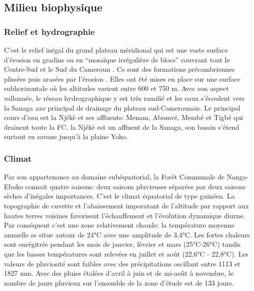 \documentclass[
  12pt,
  a4paper,
  extrafontsizes,
  onecolumn,
  openright]{book}
\theoremstyle{definition}
\theoremstyle{definition}
\theoremstyle{definition}
\theoremstyle{definition}
\theoremstyle{remark}
\begin{document}
\hypertarget{milieu-biophysique}{%
\subsection{Milieu biophysique}\label{milieu-biophysique}}

\hypertarget{relief-et-hydrographie}{%
\subsubsection{Relief et hydrographie}\label{relief-et-hydrographie}}

C'est le relief inégal du grand plateau méridional qui est une vaste surface d'érosion en gradins ou en \enquote{mosaïque irrégulière de blocs} couvrant tout le Centre-Sud et le Sud du Cameroun \citep{Martin1966}. Ce sont des formations précambriennes plissées puis arasées par l'érosion \citep{Servant2000}. Elles ont été mises en place sur une surface subhorizontale où les altitudes varient entre 600 et 750 m. Avec son aspect vallonnée, le réseau hydrographique y est très ramifié et les eaux s'écoulent vers la Sanaga axe principal de drainage du plateau sud-Camerounais. Le principal cours d'eau est la Njékè et ses affluents: Menam, Abomvé, Membé et Tigbé qui drainent toute la FC. la Njékè est un affluent de la Sanaga, son bassin s'étend surtout en savane jusqu'à la plaine Yoko.

\hypertarget{climat}{%
\subsubsection{Climat}\label{climat}}

Par son appartenance au domaine subéquatorial, la Forêt Communale de Nanga-Eboko connait quatre saisons: deux saisons pluvieuses séparées par deux saisons sèches d'inégales importances. C'est le climat équatorial de type guinéen. La topographie de cuvette et l'abaissement imporatant de l'altitude par rapport aux hautes terres voisines favorisent l'échauffement et l'évolution dynamique diurne. Par conséquent c'est une zone relativement chaude: la température moyenne annuelle se situe autour de 24°C avec une amplitude de 3,4°C. Les fortes chaleurs sont enrégitrés pendant les mois de janvier, février et mars (25°C-26°C) tandis que les basses températures sont relevées en juillet et août (22,6°C - 22,8°C). Les valeurs de pluviosité sont faibles avec des précipitations oscillant entre 1113 et 1827 mm. Avec des pluies étalées d'avril à juin et de mi-août à novembre, le nombre de jours pluvieux sur l'ensemble de la zone d'étude est de 133 jours.
\end{document}
